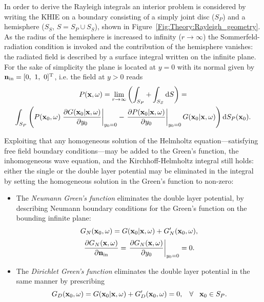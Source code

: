 

In order to derive the Rayleigh integrals an interior problem is considered by writing the KHIE on a boundary consisting of a simply joint disc ($S_P$) and a hemisphere ($S_S$, $S = S_P \cup S_S$), shown in Figure\ \ref{Fig:Theory:Rayleigh_geometry}. As the radius of the hemisphere is increased to infinity ($r \rightarrow \infty$) the Sommerfeld-radiation condition is invoked and the contribution of the hemisphere vanishes: the radiated field is described by a surface integral written on the infinite plane. 
For the sake of simplicity the plane is located at $y=0$ with its normal given by $\vni = [0,\ 1,\ 0]^{\mathrm{T}}$, i.e. the field at $y>0$ reads
\begin{multline}
P(\mathbf{x},\omega) = \lim_{r\rightarrow \infty} \left( \int_{S_P} + \int_{S_S} \mathrm{d} S \right) = \\
\int_{S_P}  \left( 
P(\mathbf{x}_0,\omega)  
\left. \frac{\partial G(\mathbf{x}_0|\mathbf{x},\omega)}{\partial y_0} \right|_{y_0 = 0} 
-
\left. \frac{\partial P(\mathbf{x}_0|\mathbf{x},\omega)}{\partial y_0} \right|_{y_0 = 0} 
G(\mathbf{x}_0|\mathbf{x},\omega) 
\right)   \mathrm{d} S_P ( \mathbf{x}_0).
\end{multline}

Exploiting that any homogeneous solution of the Helmholtz equation---satisfying free field boundary conditions---may be added to the Green's function, the inhomogeneous wave equation, and the Kirchhoff-Helmholtz integral still holds: either the single or the double layer potential may be eliminated in the integral by setting the homogeneous solution in the Green's function to non-zero:
\begin{itemize}
\item The \emph{Neumann Green's function} eliminates the double layer potential, by describing Neumann boundary conditions for the Green's function on the bounding infinite plane:
\begin{equation}
G_N(\mathbf{x}_0,\omega) = G(\mathbf{x}_0|\mathbf{x},\omega) + G'_N(\mathbf{x}_0,\omega),
\end{equation}
\begin{equation}
\frac{\partial G_N(\mathbf{x},\omega) }{\partial \mathbf{n}_{\mathrm{in}}} = \left. \frac{\partial G_N(\mathbf{x},\omega) }{\partial y_0} \right|_{y_0 = 0} = 0.
\label{Eq:Theory:Neumann_Greenfun_def}
\end{equation}
\item The \emph{Dirichlet Green's function} eliminates the double layer potential in the same manner by prescribing
\begin{equation}
G_D(\mathbf{x}_0,\omega) = G(\mathbf{x}_0|\mathbf{x},\omega) + G'_D(\mathbf{x}_0,\omega) = 0, \hspace{3mm} \forall \hspace{3mm} \mathbf{x}_0 \in S_P.
\label{Eq:Theory:Dirichlet_Greenfun_def}
\end{equation}
\end{itemize}

